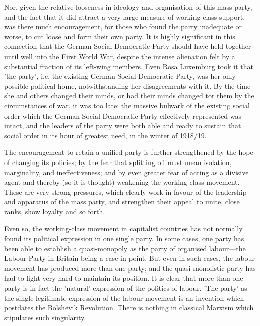 Nor, given the relative looseness in ideology and organisation of this mass party, and the fact that it did attract a very large measure of working-class support, was there much encouragement, for those who found the party inadequate or worse, to cut loose and form their own party. It is highly significant in this connection that the German Social Democratic Party should have held together until well into the First World War, despite the intense alienation felt by a substantial fraction of its left\hyp{}wing members. Even Rosa Luxemburg took it that 'the party', i.e. the existing German Social Democratic Party, was her only possible political home, notwithstanding her disagreements with it. By the time she and others changed their minds, or had their minds changed tor them by the circumstances of war, it was too late: the massive bulwark of the existing social order which the German Social Democratic Party effectively represented was intact, and the leaders of the party were both able and ready to sustain that social order in its hour of greatest need, in the winter of 1918/19.

The encouragement to retain a unified party is further strengthened by the hope of changing its policies; by the fear that splitting off must mean isolation, marginality, and ineffectiveness; and by even greater fear of acting as a divisive agent and thereby (so it is thought) weakening the working-class movement. These are very strong pressures, which clearly work in favour of the leadership and apparatus of the mass party, and strengthen their appeal to unite, close ranks, show loyalty and so forth.

Even so, the working-class movement in capitalist countries has not normally found its political expression in one single party. In some cases, one party has been able to establish a quasi-monopoly as the party of organised labour—the Labour Party in Britain being a case in point. But even in such cases, the labour movement has produced more than one party; and the quasi\hyp{}monolistic party has had to fight very hard to maintain its position. It is clear that more-than-one-party is in fact the 'natural' expression of the politics of labour. 'The party' as the single legitimate expression of the labour movement is an invention which postdates the Bolshevik Revolution. There is nothing in classical Marxism which stipulates such singularity.

